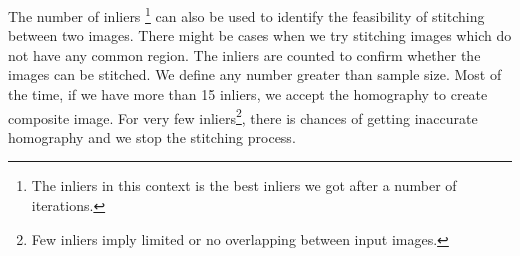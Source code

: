 \noindent The number of inliers \footnote{The inliers in this context is the best inliers we got after a number of iterations.} can also be used to identify the feasibility of stitching between two images. There might be cases when we try stitching images which do not have any common region. The inliers are counted to confirm whether the images can be stitched. We define any number greater than sample size. Most of the time, if we have more than 15 inliers, we accept the homography to create composite image. For very few inliers\footnote{Few inliers imply limited or no overlapping between input images.}, there is chances of getting inaccurate homography and we stop the stitching process.

